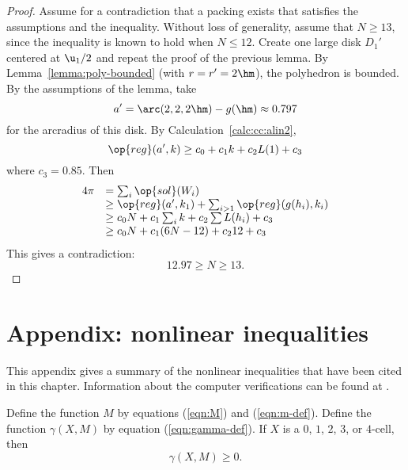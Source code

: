 \begin{proof} Assume for a contradiction that a packing exists that
satisfies the assumptions and the inequality.  Without loss of
generality, assume that $N\ge 13$, since the inequality is known to
hold when $N\le 12$.  Create one large disk $D_1'$ centered at $
\u_1/2$ and repeat the proof of the previous lemma.  By
Lemma~\ref{lemma:poly-bounded} (with $r=r'=2\hm$), the polyhedron is
bounded.  By the assumptions of the lemma, take
\begin{displaymath}a'=\arc(2,2,2\hm)-g(\hm) \approx 0.797\end{displaymath}
for the arcradius of this disk.  By Calculation~\ref{calc:cc:alin2}, %
\begin{displaymath}\op{reg}(a',k) \ge c_0 + c_1 k + c_2 L(1) +
c_3\end{displaymath}
where $c_3 = 0.85$.
Then 
\begin{displaymath}
\begin{array}{lll}
4\pi &= \sum_i\op{sol}(W_i)\\
&\ge \op{reg}(a',k_1)+\sum_{i>1} \op{reg}(g(h_i),k_i) \\
&\ge  c_0 N +c_1\sum_i k + c_2 \sum L(h_i) + c_3\\
&\ge c_0 N +c_1 (6N-12) + c_2 12 + c_3\\
\end{array}
\end{displaymath}
This gives a contradiction:
\begin{displaymath}
12.97 \ge N \ge 13.
\end{displaymath}
\end{proof}

\section{Appendix: nonlinear inequalities}

This appendix gives a summary of the nonlinear inequalities that have
been cited in this chapter.  Information about the computer
verifications can be found at \cite{hales:2009:nonlinear}.

\begin{calculation}\label{calc:marchal}
Define the function $M$ by equations (\ref{eqn:M}) and
(\ref{eqn:m-def}).  Define the function $\gamma(X,M)$ by equation
(\ref{eqn:gamma-def}).  If $X$ is a $0$, $1$, $2$, $3$, or $4$-cell,
then
\begin{displaymath}
\gamma(X,M)\ge 0.
\end{displaymath}
\end{calculation}

